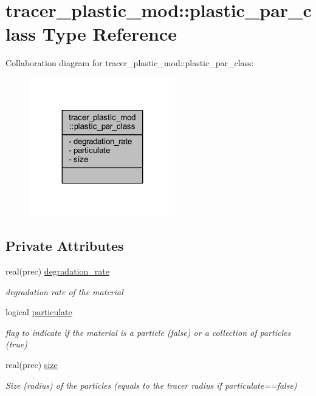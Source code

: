 \hypertarget{structtracer__plastic__mod_1_1plastic__par__class}{}\section{tracer\+\_\+plastic\+\_\+mod\+:\+:plastic\+\_\+par\+\_\+class Type Reference}
\label{structtracer__plastic__mod_1_1plastic__par__class}


Collaboration diagram for tracer\+\_\+plastic\+\_\+mod\+:\+:plastic\+\_\+par\+\_\+class\+:
\nopagebreak
\begin{figure}[H]
\begin{center}
\leavevmode
\includegraphics[width=179pt]{structtracer__plastic__mod_1_1plastic__par__class__coll__graph}
\end{center}
\end{figure}
\subsection*{Private Attributes}
\begin{DoxyCompactItemize}
\item 
real(prec) \mbox{\hyperlink{structtracer__plastic__mod_1_1plastic__par__class_ae693d6112d2600408a274273d53c397e}{degradation\+\_\+rate}}
\begin{DoxyCompactList}\small\item\em degradation rate of the material \end{DoxyCompactList}\item 
logical \mbox{\hyperlink{structtracer__plastic__mod_1_1plastic__par__class_afbec8826947883ba3d3c5bc29759a80c}{particulate}}
\begin{DoxyCompactList}\small\item\em flag to indicate if the material is a particle (false) or a collection of particles (true) \end{DoxyCompactList}\item 
real(prec) \mbox{\hyperlink{structtracer__plastic__mod_1_1plastic__par__class_a4436f491c11ebd046b3a74987ff71eee}{size}}
\begin{DoxyCompactList}\small\item\em Size (radius) of the particles (equals to the tracer radius if particulate==false) \end{DoxyCompactList}\end{DoxyCompactItemize}


